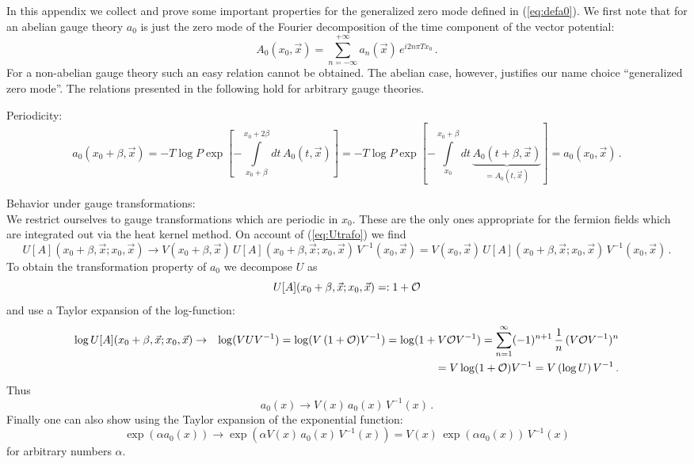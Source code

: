 \documentclass[a4paper,showpacs,showkeys,prd,nofootinbib]{revtex4}
\begin{document}
In this appendix we collect and prove some important properties for the generalized
zero mode defined in (\ref{eq:defa0}). We first note that for an abelian gauge theory
$a_0$ is just the zero mode of the Fourier decomposition of the time component of the
vector potential:
\begin{equation}
  \label{eq:a0abel}
A_0(x_0,\vec x) = 
\sum\limits_{n=-\infty}^{+\infty} a_n(\vec x) \, e^{i 2 n \pi T x_0} \,.
\end{equation}
For a non-abelian gauge theory such an easy relation cannot be obtained. The abelian
case, however, justifies our name choice ``generalized zero mode''. 
The relations presented in the following hold for arbitrary gauge theories. 

Periodicity:
\begin{equation}
  \label{eq:a0period}
a_0(x_0+\beta,\vec x) = -T \log P \exp 
\left[-\int\limits_{x_0+\beta}^{x_0+2\beta} dt \, A_0(t,\vec x) \right] 
= -T \log P \exp 
\left[-\int\limits_{x_0}^{x_0+\beta} dt \, 
\underbrace{A_0(t+\beta,\vec x)}_{=A_0(t,\vec x)} \right] 
= a_0(x_0,\vec x)   \,.
\end{equation}

Behavior under gauge transformations: \\
We restrict ourselves to gauge transformations which are periodic in $x_0$. These are
the only ones appropriate for the fermion fields which are integrated out via the
heat kernel method. On account of (\ref{eq:Utrafo}) we find
\begin{equation}
  \label{eq:poltrafo}
U[A](x_0+\beta,\vec x;x_0,\vec x) \to 
V(x_0+\beta,\vec x) \, U[A](x_0+\beta,\vec x;x_0,\vec x) \, V^{-1}(x_0,\vec x)
= V(x_0,\vec x) \, U[A](x_0+\beta,\vec x;x_0,\vec x) \, V^{-1}(x_0,\vec x)   \,.
\end{equation}
To obtain the transformation property of $a_0$ we decompose $U$ as
\begin{equation}
  \label{eq:defcalO}
U[A](x_0+\beta,\vec x;x_0,\vec x) =: 1 + {\cal O}
\end{equation}
and use a Taylor expansion of the log-function:
\begin{eqnarray}
  \label{eq:taylorlog}
\log U[A](x_0+\beta,\vec x;x_0,\vec x) & \to & \log( V U V^{-1}) = 
\log( V \, (1 + {\cal O}) V^{-1}) = \log(1+ V {\cal O} V^{-1}) = 
\sum\limits_{n=1}^\infty (-1)^{n+1} \, {1 \over n} \, (V {\cal O} V^{-1})^n 
\nonumber \\ && =
V \log(1 + {\cal O}) V^{-1} = V \, (\log U) \, V^{-1}  \,.
\end{eqnarray}
Thus
\begin{equation}
  \label{eq:a0trafo}
a_0(x) \to V(x) \, a_0(x) \, V^{-1}(x)   \,.
\end{equation}
Finally one can also show using the Taylor expansion of the exponential function:
\begin{equation}
  \label{eq:trafoexp}
\exp\left(\alpha a_0(x)\right) \to \exp\left(\alpha V(x) \, a_0(x) \, V^{-1}(x)\right) = 
V(x) \, \exp\left(\alpha a_0(x) \right) \, V^{-1}(x)
\end{equation}
for arbitrary numbers $\alpha$.
\end{document}
